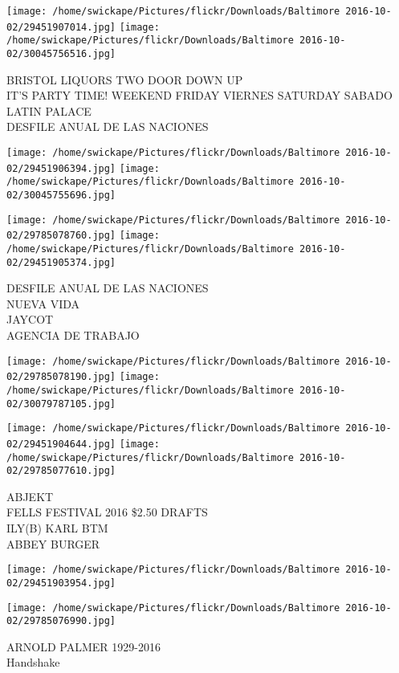 \documentclass[10pt,letterpaper]{article}
\begin{document}
\texttt{[image: /home/swickape/Pictures/flickr/Downloads/Baltimore 2016-10-02/29451907014.jpg]}
\texttt{[image: /home/swickape/Pictures/flickr/Downloads/Baltimore 2016-10-02/30045756516.jpg]}

BRISTOL LIQUORS TWO DOOR DOWN UP\\
IT'S PARTY TIME!  WEEKEND FRIDAY VIERNES SATURDAY SABADO\\
LATIN PALACE\\
DESFILE ANUAL DE LAS NACIONES
\pagebreak

\texttt{[image: /home/swickape/Pictures/flickr/Downloads/Baltimore 2016-10-02/29451906394.jpg]}
\texttt{[image: /home/swickape/Pictures/flickr/Downloads/Baltimore 2016-10-02/30045755696.jpg]}

\texttt{[image: /home/swickape/Pictures/flickr/Downloads/Baltimore 2016-10-02/29785078760.jpg]}
\texttt{[image: /home/swickape/Pictures/flickr/Downloads/Baltimore 2016-10-02/29451905374.jpg]}

DESFILE ANUAL DE LAS NACIONES\\
NUEVA VIDA\\
JAYCOT\\
AGENCIA DE TRABAJO
\pagebreak

\texttt{[image: /home/swickape/Pictures/flickr/Downloads/Baltimore 2016-10-02/29785078190.jpg]}
\texttt{[image: /home/swickape/Pictures/flickr/Downloads/Baltimore 2016-10-02/30079787105.jpg]}

\texttt{[image: /home/swickape/Pictures/flickr/Downloads/Baltimore 2016-10-02/29451904644.jpg]}
\texttt{[image: /home/swickape/Pictures/flickr/Downloads/Baltimore 2016-10-02/29785077610.jpg]}

ABJEKT\\
FELLS FESTIVAL 2016 \$2.50 DRAFTS\\
ILY(B) KARL BTM\\
ABBEY BURGER
\pagebreak

\texttt{[image: /home/swickape/Pictures/flickr/Downloads/Baltimore 2016-10-02/29451903954.jpg]}

\vspace{0.25in}
\texttt{[image: /home/swickape/Pictures/flickr/Downloads/Baltimore 2016-10-02/29785076990.jpg]}

ARNOLD PALMER 1929{-}2016\\
Handshake
\pagebreak
\end{document}
